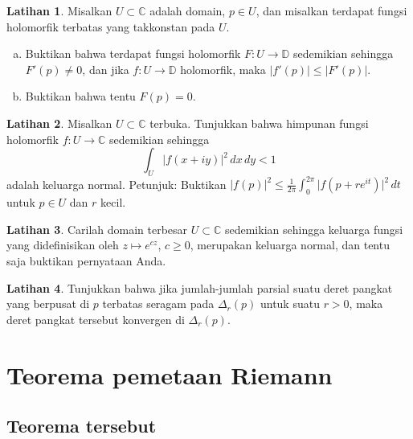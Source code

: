 \documentclass[12pt,openany]{book}
\newcommand{\sabs}[1]{\lvert {#1} \rvert}
\newcommand{\abs}[1]{\left\lvert {#1} \right\rvert}
\newcommand{\C}{{\mathbb{C}}}
\newcommand{\D}{{\mathbb{D}}}
\theoremstyle{plain}
\theoremstyle{remark}
\theoremstyle{definition}
\newenvironment{exbox}{%
    \def\FrameCommand{\vrule width 1pt \relax\hspace{10pt}}%
    \MakeFramed{\advance\hsize-\width\FrameRestore}%
}{%
    \endMakeFramed
}
\newenvironment{exparts}{%
    \leavevmode\begin{enumerate}[a),noitemsep,topsep=0pt,parsep=0pt,partopsep=0pt]
}{%
    \end{enumerate}
}
\theoremstyle{exercise}
\newtheorem{exercise}{Latihan}[section]
\theoremstyle{example}
\begin{document}
\begin{exbox}
\begin{exercise}
Misalkan $U \subset \C$ adalah domain, $p \in U$,
dan misalkan terdapat fungsi holomorfik terbatas yang takkonstan
pada $U$.
\begin{exparts}
\item
Buktikan bahwa terdapat fungsi holomorfik $F \colon U \to \D$
sedemikian sehingga
$F'(p) \neq 0$, dan jika
$f \colon U \to \D$ holomorfik,
maka $\sabs{f'(p)} \leq \sabs{F'(p)}$.
\item
Buktikan bahwa tentu $F(p) = 0$.
\end{exparts}
\end{exercise}

\begin{exercise}
Misalkan $U \subset \C$ terbuka.
Tunjukkan bahwa himpunan fungsi holomorfik
$f \colon U \to \C$ sedemikian sehingga
\begin{equation*}
\int_{U} \abs{f(x+iy)}^2 \, dx \, dy < 1
\end{equation*}
adalah keluarga normal.
Petunjuk:
Buktikan
$\sabs{f(p)}^2 \leq
\frac{1}{2\pi} \int_{0}^{2\pi} \sabs{f(p+re^{it})}^2 \, dt$
untuk $p \in U$ dan $r$ kecil.
\end{exercise}

\begin{exercise}
Carilah domain terbesar $U \subset \C$ sedemikian sehingga keluarga
fungsi yang didefinisikan oleh $z \mapsto e^{cz}$, $c \geq 0$, merupakan
keluarga normal, dan tentu saja buktikan pernyataan Anda.
\end{exercise}

\begin{exercise}
Tunjukkan bahwa jika jumlah-jumlah parsial suatu deret pangkat yang berpusat di $p$
terbatas seragam pada $\Delta_r(p)$ untuk suatu $r > 0$,
maka deret pangkat tersebut konvergen di $\Delta_r(p)$.
\end{exercise}
\end{exbox}


\section{Teorema pemetaan Riemann}
\label{sec:RMT}

\subsection{Teorema tersebut}\label{subsec:RMT}
\end{document}
